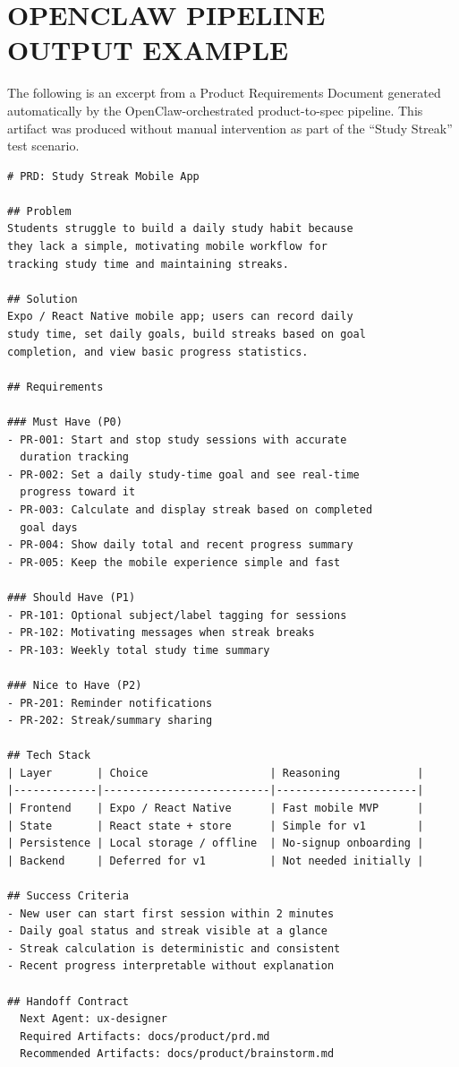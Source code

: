 \documentclass[a4paper,12pt]{report}
\begin{document}
\chapter{OPENCLAW PIPELINE OUTPUT EXAMPLE}
\label{app:openclawOutput}

The following is an excerpt from a Product Requirements Document generated automatically by the OpenClaw-orchestrated product-to-spec pipeline. This artifact was produced without manual intervention as part of the ``Study Streak'' test scenario.

\begin{small}
\begin{verbatim}
# PRD: Study Streak Mobile App

## Problem
Students struggle to build a daily study habit because 
they lack a simple, motivating mobile workflow for 
tracking study time and maintaining streaks.

## Solution
Expo / React Native mobile app; users can record daily 
study time, set daily goals, build streaks based on goal 
completion, and view basic progress statistics.

## Requirements

### Must Have (P0)
- PR-001: Start and stop study sessions with accurate 
  duration tracking
- PR-002: Set a daily study-time goal and see real-time 
  progress toward it
- PR-003: Calculate and display streak based on completed 
  goal days
- PR-004: Show daily total and recent progress summary
- PR-005: Keep the mobile experience simple and fast

### Should Have (P1)
- PR-101: Optional subject/label tagging for sessions
- PR-102: Motivating messages when streak breaks
- PR-103: Weekly total study time summary

### Nice to Have (P2)
- PR-201: Reminder notifications
- PR-202: Streak/summary sharing

## Tech Stack
| Layer       | Choice                   | Reasoning            |
|-------------|--------------------------|----------------------|
| Frontend    | Expo / React Native      | Fast mobile MVP      |
| State       | React state + store      | Simple for v1        |
| Persistence | Local storage / offline  | No-signup onboarding |
| Backend     | Deferred for v1          | Not needed initially |

## Success Criteria
- New user can start first session within 2 minutes
- Daily goal status and streak visible at a glance
- Streak calculation is deterministic and consistent
- Recent progress interpretable without explanation

## Handoff Contract
  Next Agent: ux-designer
  Required Artifacts: docs/product/prd.md
  Recommended Artifacts: docs/product/brainstorm.md
\end{verbatim}
\end{small}
\end{document}
